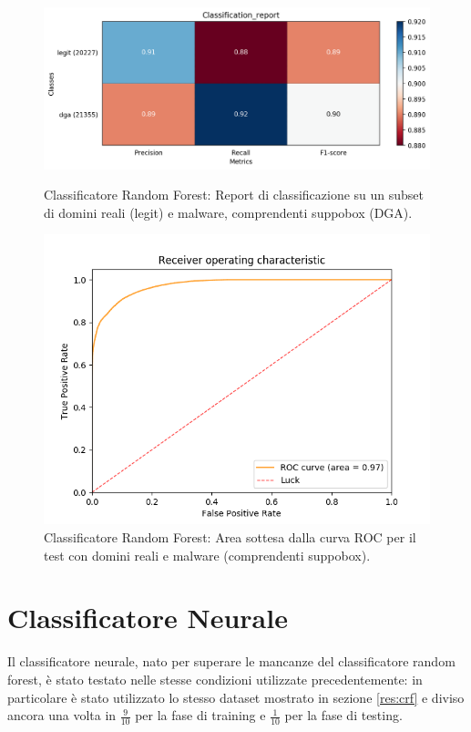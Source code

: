 \begin{figure}[!bp]
    \centering
    \includegraphics[width=.85\columnwidth]{figures/rndf_tra_sup_sup/class_rep.png}
    \caption{Classificatore Random Forest: Report di classificazione su un subset di domini reali (legit) e malware, comprendenti suppobox (DGA).\label{fig:repall}}

    \centering
    \includegraphics[width=.85\columnwidth]{figures/rndf_tra_sup_sup/roc_plot.png}
    \caption{Classificatore Random Forest: Area sottesa dalla curva ROC per il test con domini reali e malware (comprendenti suppobox).\label{fig:rocall}}
\end{figure}

\newpage
\section{Classificatore Neurale}
\label{ris:cnn}
Il classificatore neurale, nato per superare le mancanze del classificatore random forest, è stato testato nelle stesse condizioni utilizzate precedentemente: in particolare è stato utilizzato lo stesso dataset mostrato in sezione \ref{res:crf} e diviso ancora una volta in $\frac{9}{10}$ per la fase di training e $\frac{1}{10}$ per la fase di testing.

